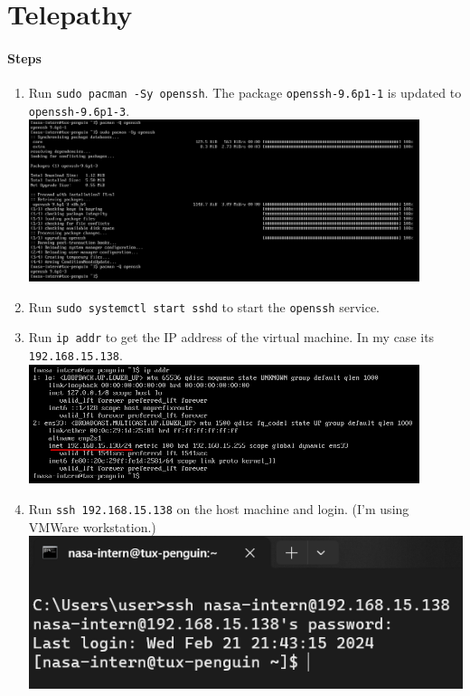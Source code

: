 \documentclass[12pt, a4paper]{article}
\begin{document}
  \section{Telepathy}
  \paragraph{Steps}
  \begin{enumerate}
    \item Run \verb|sudo pacman -Sy openssh|. The package
      \verb|openssh-9.6p1-1| is updated to\\ \verb|openssh-9.6p1-3|.\\
      \includegraphics[width=0.9\textwidth]{sa_p2_openssh_upgrade.png}
    \item Run \verb|sudo systemctl start sshd| to start the \verb|openssh|
      service.
    \item Run \verb|ip addr| to get the IP address of the virtual machine.
      In my case its \verb|192.168.15.138|.\\
      \includegraphics[width=0.9\textwidth]{sa_p2_ip.png}
    \item Run \verb|ssh 192.168.15.138| on the host machine and login.
      (I'm using VMWare workstation.)\\
      \includegraphics[width=0.6\linewidth]{sa_p2_ssh_login.png}
  \end{enumerate}
\end{document}
